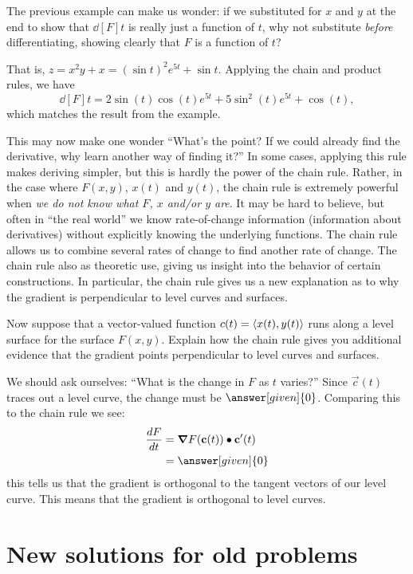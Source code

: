 \documentclass{ximera}
\begin{document}
The previous example can make us wonder: if we substituted for $x$ and
$y$ at the end to show that $\dd[F]{t}$ is really just a function of
$t$, why not substitute \textit{before} differentiating, showing
clearly that $F$ is a function of $t$?

That is, $z = x^2y+x = (\sin t)^2e^{5t}+\sin t.$ Applying the chain
and product rules, we have
\[
\dd[F]{t} = 2\sin(t)\cos(t) e^{5t}+ 5\sin^2(t) e^{5t}+\cos(t),
\]
which matches the result from the example.

This may now make one wonder ``What's the point? If we could already
find the derivative, why learn another way of finding it?'' In some
cases, applying this rule makes deriving simpler, but this is hardly
the power of the chain rule. Rather, in the case where $F(x,y)$,
$x(t)$ and $y(t)$, the chain rule is extremely powerful when
\textit{we do not know what $F$, $x$ and/or $y$ are}. It may be hard
to believe, but often in ``the real world'' we know rate-of-change
information (information about derivatives) without explicitly knowing
the underlying functions. The chain rule allows us to combine several
rates of change to find another rate of change. The chain rule also as
theoretic use, giving us insight into the behavior of certain
constructions. In particular, the chain rule gives us a new
explanation as to why the gradient is perpendicular to level curves
and surfaces.

\begin{example}
  Now suppose that a vector-valued function $c(t)=\left\langle x(t),y(t)\right\rangle$
  runs along a level surface for the surface $F(x,y)$. Explain how the
  chain rule gives you additional evidence that the gradient points
  perpendicular to level curves and surfaces.
  \begin{explanation}
    We should ask ourselves: ``What is the change in $F$ as $t$
    varies?''  Since $\vec{c}(t)$ traces out a level curve, the change
    must be $\answer[given]{0}$. Comparing this to the chain rule we see:
    \begin{align*}
    \dd[F]{t} &= \grad F(\vec{c}(t)) \dotp \vec{c}'(t) \\
    &= \answer[given]{0}
    \end{align*}
    this tells us that the gradient is orthogonal to the tangent
    vectors of our level curve. This means that the gradient is
    orthogonal to level curves.
  \end{explanation}
\end{example}


\section{New solutions for old problems}
\end{document}
